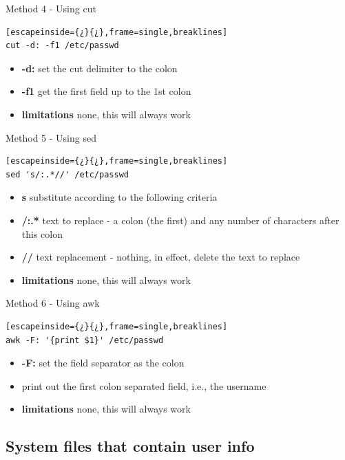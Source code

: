 Method 4 - Using cut

\begin{lstlisting}[escapeinside={¿}{¿},frame=single,breaklines]
cut -d: -f1 /etc/passwd
\end{lstlisting}

\begin{itemize}
	\item \textbf{-d:} set the cut delimiter to the colon
	\item \textbf{-f1} get the first field up to the 1st colon
	\item \textbf{limitations} none, this will always work
\end{itemize}

Method 5 - Using sed

\begin{lstlisting}[escapeinside={¿}{¿},frame=single,breaklines]
sed 's/:.*//' /etc/passwd
\end{lstlisting}

\begin{itemize}
	\item \textbf{s} substitute according to the following criteria
	\item \textbf{/:.*} text to replace - a colon (the first) and any number of characters after this colon
	\item \textbf{//} text replacement - nothing, in effect, delete the text to replace
	\item \textbf{limitations} none, this will always work
\end{itemize}

Method 6 - Using awk

\begin{lstlisting}[escapeinside={¿}{¿},frame=single,breaklines]
awk -F: '{print $1}' /etc/passwd
\end{lstlisting}

\begin{itemize}
	\item \textbf{-F:} set the field separator as the colon
	\item \textbf{} print out the first colon separated field, i.e., the username
	\item \textbf{limitations} none, this will always work
\end{itemize}

\subsection{System files that contain user info}

